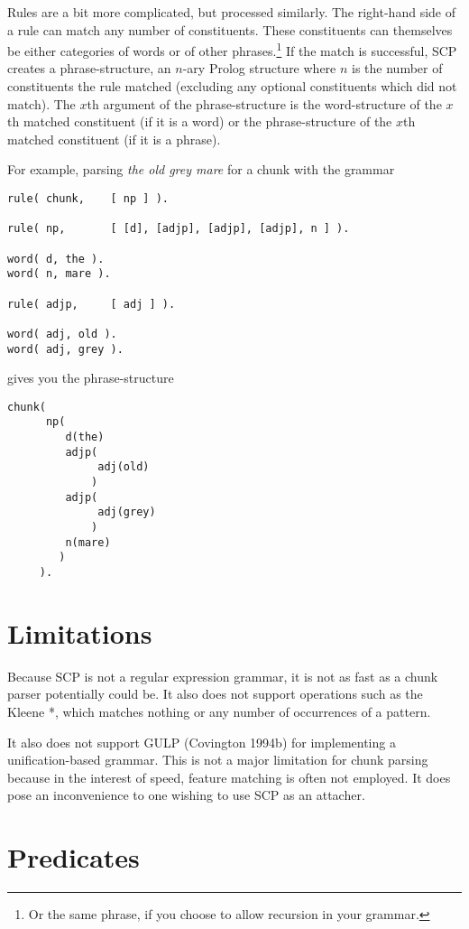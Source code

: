 \documentclass[12pt]{article}
\begin{document}
Rules are a bit more complicated, but processed similarly.  The right-hand side of a rule can match any number of constituents.  These constituents can themselves be either categories of words or of other phrases.\footnote{Or the same phrase, if you choose to allow recursion in your grammar.}  If the match is successful, SCP creates a phrase-structure, an $n$-ary Prolog structure where $n$ is the number of constituents the rule matched (excluding any optional constituents which did not match).  The $x$th argument of the phrase-structure is the word-structure of the $x$th matched constituent (if it is a word) or the phrase-structure of the $x$th matched constituent (if it is a phrase).

For example, parsing \emph{the old grey mare} for a chunk with the grammar
\begin{verbatim}
rule( chunk,    [ np ] ).

rule( np,       [ [d], [adjp], [adjp], [adjp], n ] ).

word( d, the ).
word( n, mare ).

rule( adjp,     [ adj ] ).

word( adj, old ).
word( adj, grey ).
\end{verbatim}
gives you the phrase-structure
\begin{verbatim}
chunk(
      np(
         d(the) 
         adjp(
              adj(old) 
             ) 
         adjp( 
              adj(grey) 
             ) 
         n(mare) 
        ) 
     ).
\end{verbatim}

\section{Limitations}

Because SCP is not a regular expression grammar, it is not as fast as a chunk parser potentially could be.  It also does not support operations such as the Kleene *, which matches nothing or any number of occurrences of a pattern.

It also does not support GULP (Covington 1994b) for implementing a unification-based grammar.  This is not a major limitation for chunk parsing because in the interest of speed, feature matching is often not employed.  It does pose an inconvenience to one wishing to use SCP as an attacher.

\section{Predicates}
\end{document}
